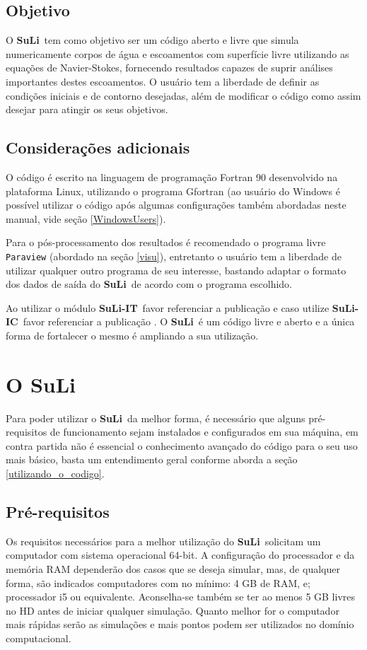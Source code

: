 \documentclass[12pt, a4paper]{article}
\newcommand{\SL}{{\bf SuLi}}
\newcommand{\SLIT}{{\bf SuLi-IT}}
\newcommand{\SLIC}{{\bf SuLi-IC}}
\begin{document}
\subsection{Objetivo}
O \SL\ tem como objetivo ser um código aberto e livre que simula numericamente corpos de água e escoamentos com superfície livre utilizando as equações de Navier-Stokes, fornecendo resultados capazes de suprir análises importantes destes escoamentos. O usuário tem a liberdade de definir as condições iniciais e de contorno desejadas, além de modificar o código como assim desejar para atingir os seus objetivos.

\subsection{Considerações adicionais}
O código é escrito na linguagem de programação Fortran 90 desenvolvido na plataforma Linux, utilizando o programa Gfortran (ao usuário do Windows é possível utilizar o código após algumas configurações também abordadas neste manual, vide seção \ref{WindowsUsers}).

Para o pós-processamento dos resultados é recomendado o programa livre \verb|Paraview| (abordado na seção \ref{visu}), entretanto o usuário tem a liberdade de utilizar qualquer outro programa de seu interesse, bastando adaptar o formato dos dados de saída do \SL\ de acordo com o programa escolhido.

Ao utilizar o módulo \SLIT\ favor referenciar a publicação \cite{monteiro2014} e caso utilize \SLIC\ favor referenciar a publicação \cite{monteiro2019}. O \SL\ é um código livre e aberto e a única forma de fortalecer o mesmo é ampliando a sua utilização.

\newpage


\section{O SuLi}
Para poder utilizar o \SL\ da melhor forma, é necessário que alguns pré-requisitos de funcionamento sejam instalados e configurados em sua máquina, em contra partida não é essencial o conhecimento avançado do código para o seu uso mais básico, basta um entendimento geral conforme aborda a seção \ref{utilizando_o_codigo}.

\subsection{Pré-requisitos}
Os requisitos necessários para a melhor utilização do \SL\ solicitam um computador com sistema operacional 64-bit. A configuração do processador e da memória RAM dependerão dos casos que se deseja simular, mas, de qualquer forma, são indicados computadores com no mínimo: 4 GB de RAM, e; processador i5 ou equivalente. Aconselha-se também se ter ao menos 5 GB livres no HD antes de iniciar qualquer simulação. Quanto melhor for o computador mais rápidas serão as simulações e mais pontos podem ser utilizados no domínio computacional. 
\end{document}
